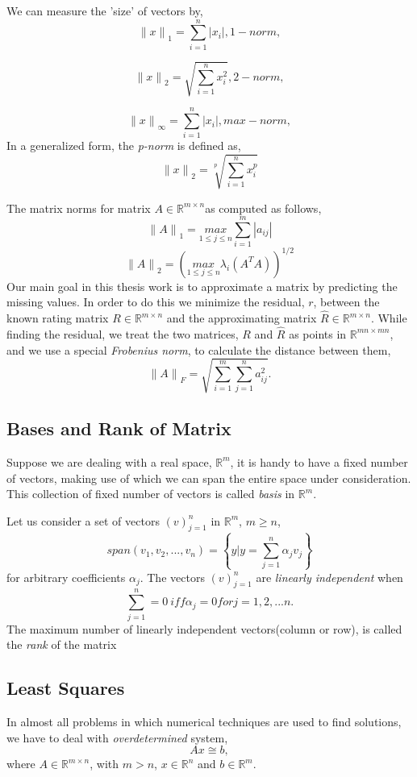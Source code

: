 We can measure the 'size' of vectors by,
\[
 {\|x\|}_1 = \sum_{i=1}^{n}|x_i|,		1-norm,
\]

\[
 {\|x\|}_2 = \sqrt{\sum_{i=1}^{n}x_i^2},		2-norm,
\]

\[
 {\|x\|}_\infty = \sum_{i=1}^{n}|x_i|,		max-norm,
\]
 In a generalized form, the \emph{p-norm} is defined as, 
 \[
 {\|x\|}_2 = \sqrt[p]{\sum_{i=1}^{n}x_i^p}
 \]

 The matrix norms for matrix $A\in\mathbb{R}^{m \times n}$as computed as
follows,
 \[
 {\|A\|}_1 = \underset{1\leq j\leq n}{max}{\sum_{i=1}^{m}|a_{ij}|}
 \]
 \[
 {\|A\|}_2 = (\underset{1\leq j\leq n}{max}{\lambda_i(A^TA)})^{1/2}
 \]
Our main goal in this thesis work is to approximate a matrix by predicting the
missing values. In order to do this we minimize the residual, $r$, between the
known rating matrix $R\in\mathbb{R}^{m \times n}$ and the approximating matrix
$\hat{R}\in\mathbb{R}^{m \times n}$. While finding the residual, we treat the
two matrices, $R$ and $\hat{R}$ as points in $\mathbb{R}^{mn \times mn}$, and we
use a special \emph{Frobenius norm}, to calculate the distance between them,
 \[
 {\|A\|}_F = \sqrt{\sum_{i=1}^{m}\sum_{j=1}^{n}a_{ij}^2}.
 \]
 
 \subsection{Bases and Rank of Matrix}
 Suppose we are dealing with a real space, $\mathbb{R}^m$, it is handy
to have a fixed number of vectors, making use of which we can span the entire
space under consideration. This collection of fixed number of vectors is called
\emph{basis} in $\mathbb{R}^m$. 

Let us consider a set of vectors $(v)_{j=1}^n$ in $\mathbb{R}^m$, $m\geq n$, 
\[
 span(v_1,v_2,...,v_n)=\left\{ y|y=\sum_{j=1}^{n}\alpha_{j}v_j \right\}
\]
for arbitrary coefficients $\alpha_j$. The vectors $(v)_{j=1}^n$ are
\emph{linearly independent} when
\[
 \sum_{j=1}^{n}=0 \ iff \alpha_j = 0 for j=1,2,...n.
\]
The maximum number of linearly independent vectors(column or row), is called the
\emph{rank} of the matrix \cite{eld-mm:07}

\subsection{Least Squares}
In almost all problems in which numerical techniques are used to find
solutions, we have to deal with \emph{overdetermined} system, 
\[
 Ax\cong b,
\]
where $A\in \mathbb{R}^{m \times n}$, with $m>n$, $x\in \mathbb{R}^n$ and $b\in
\mathbb{R}^m$. 



